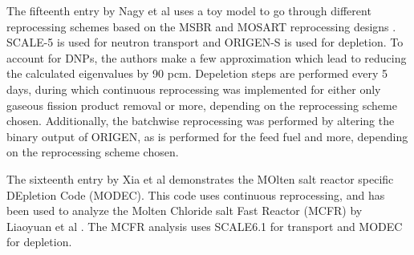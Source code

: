 The fifteenth entry by Nagy et al uses a toy model to go through different reprocessing schemes based on the MSBR and MOSART reprocessing designs \cite{robertson_conceptual_1971, ignatiev_progress_2007}. SCALE-5 \cite{noauthor_scale_2005} is used for neutron transport and ORIGEN-S is used for depletion. To account for DNPs, the authors make a few approximation which lead to reducing the calculated eigenvalues by 90 pcm. Depeletion steps are performed every 5 days, during which continuous reprocessing was implemented for either only gaseous fission product removal or more, depending on the reprocessing scheme chosen. Additionally, the batchwise reprocessing was performed by altering the binary output of ORIGEN, as is performed for the feed fuel and more, depending on the reprocessing scheme chosen.

The sixteenth entry by Xia et al demonstrates the MOlten salt reactor specific DEpletion Code (MODEC). This code uses continuous reprocessing, and has been used to analyze the Molten Chloride salt Fast Reactor (MCFR) by Liaoyuan et al \cite{liaoyuan_th-u_2021}. The MCFR analysis uses SCALE6.1 for transport and MODEC for depletion. 
